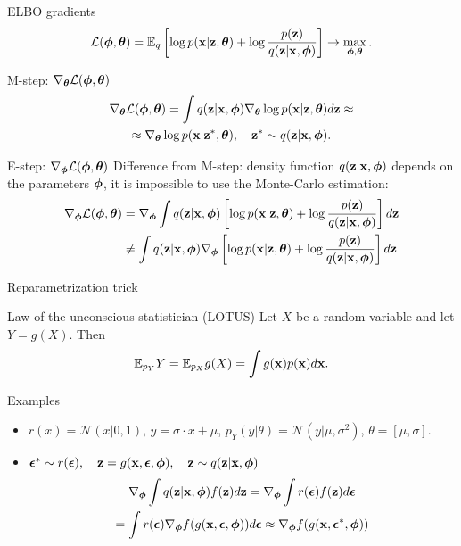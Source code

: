 \begin{frame}{ELBO gradients}
	\[
	\mathcal{L} (\boldsymbol{\phi}, \boldsymbol{\theta})  = \mathbb{E}_{q} \left[\log p(\mathbf{x} | \mathbf{z}, \boldsymbol{\theta}) + \log \frac{p(\mathbf{z})}{q(\mathbf{z} | \mathbf{x}, \boldsymbol{\phi})} \right] \rightarrow \max_{\boldsymbol{\phi}, \boldsymbol{\theta}}.
	\]	
	\begin{block}{M-step: $\nabla_{\boldsymbol{\theta}} \mathcal{L}(\boldsymbol{\phi}, \boldsymbol{\theta})$}
		\vspace{-0.7cm}
		\begin{multline*}
			\nabla_{\boldsymbol{\theta}} \mathcal{L} (\boldsymbol{\phi}, \boldsymbol{\theta})
			= \int q(\mathbf{z}|\mathbf{x}, \boldsymbol{\phi}) \nabla_{\boldsymbol{\theta}}\log p(\mathbf{x}|\mathbf{z}, \boldsymbol{\theta}) d \mathbf{z} \approx  \\
			\approx \nabla_{\boldsymbol{\theta}}\log p(\mathbf{x}|\mathbf{z}^*, \boldsymbol{\theta}), \quad \mathbf{z}^* \sim q(\mathbf{z}|\mathbf{x}, \boldsymbol{\phi}).
		\end{multline*}
		\vspace{-0.7cm}
	\end{block}
	\begin{block}{E-step: $\nabla_{\boldsymbol{\phi}} \mathcal{L}(\boldsymbol{\phi}, \boldsymbol{\theta})$}
		Difference from M-step: density function $q(\mathbf{z}| \mathbf{x}, \boldsymbol{\phi})$ depends on the parameters $\boldsymbol{\phi}$, it is impossible to use the Monte-Carlo estimation:
		\begin{align*}
			\nabla_{\boldsymbol{\phi}} \mathcal{L} (\boldsymbol{\phi}, \boldsymbol{\theta}) &= \nabla_{\boldsymbol{\phi}} \int q(\mathbf{z} | \mathbf{x}, \boldsymbol{\phi}) \left[\log p(\mathbf{x} | \mathbf{z}, \boldsymbol{\theta}) + \log \frac{p(\mathbf{z})}{q(\mathbf{z}| \mathbf{x}, \boldsymbol{\phi})} \right] d \mathbf{z} \\
			& \neq  \int q(\mathbf{z} | \mathbf{x}, \boldsymbol{\phi}) \nabla_{\boldsymbol{\phi}} \left[\log p(\mathbf{x} | \mathbf{z}, \boldsymbol{\theta}) + \log \frac{p(\mathbf{z})}{q(\mathbf{z}| \mathbf{x}, \boldsymbol{\phi})} \right] d \mathbf{z} \\
		\end{align*}
	\end{block}
\end{frame}
\begin{frame}{Reparametrization trick}
	\begin{block}{Law of the unconscious statistician (LOTUS)}
		Let $X$ be a random variable and let $Y=g(X)$. Then
		\[
		\mathbb{E}_{p_Y} Y = \mathbb{E}_{p_X} g(X) = \int g(\mathbf{x}) p(\mathbf{x}) d \mathbf{x}.
		\]
		\vspace{-0.3cm}
	\end{block}
	\begin{block}{Examples} 
		\begin{itemize}
			\item $r(x) = \mathcal{N}(x|0, 1)$, $y = \sigma \cdot x + \mu$, $p_Y(y|\theta) = \mathcal{N}(y| \mu, \sigma^2)$, $\theta = [\mu, \sigma]$.
			
			\item $\boldsymbol{\epsilon}^* \sim r(\boldsymbol{\epsilon}), \quad \mathbf{z} = g(\mathbf{x}, \boldsymbol{\epsilon}, \boldsymbol{\phi}), \quad \mathbf{z} \sim q(\mathbf{z} | \mathbf{x}, \boldsymbol{\phi})$
			\begin{multline*}
				\nabla_{\boldsymbol{\phi}}\int q(\mathbf{z}|\mathbf{x}, \boldsymbol{\phi}) f(\mathbf{z}) d\mathbf{z} = \nabla_{\boldsymbol{\phi}}\int r(\boldsymbol{\epsilon})  f(\mathbf{z}) d\boldsymbol{\epsilon} \\ = \int r(\boldsymbol{\epsilon}) \nabla_{\boldsymbol{\phi}} f(g(\mathbf{x}, \boldsymbol{\epsilon}, \boldsymbol{\phi})) d\boldsymbol{\epsilon} \approx \nabla_{\boldsymbol{\phi}} f(g(\mathbf{x}, \boldsymbol{\epsilon}^*, \boldsymbol{\phi}))
			\end{multline*}
		\end{itemize}
	\end{block}
\end{frame}
